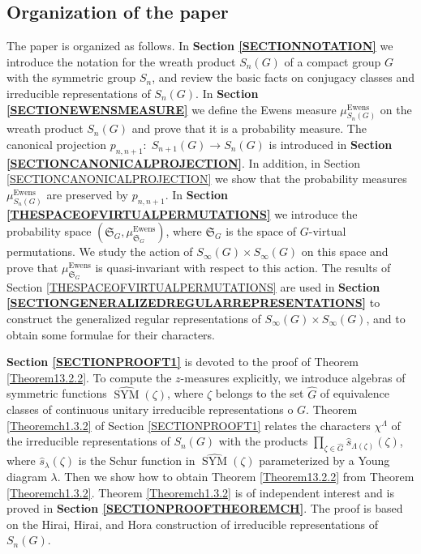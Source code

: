 \documentclass[12pt]{amsart}
\theoremstyle{definition}
\numberwithin{equation}{section}
\DeclareMathOperator{\SYM}{SYM}
\DeclareMathOperator{\Ewens}{Ewens}
\begin{document}
\subsection{Organization of the paper}
The paper is organized as follows. In \textbf{Section \ref{SECTIONNOTATION}} we introduce the notation for
the wreath product $S_n(G)$ of a compact group $G$ with the symmetric group $S_n$, and review the basic facts on conjugacy classes and irreducible representations of $S_n(G)$.
In \textbf{Section \ref{SECTIONEWENSMEASURE}} we define the Ewens measure $\mu_{S_n(G)}^{\Ewens}$ on the wreath product $S_n(G)$ and prove that it is a probability measure. The canonical projection
$p_{n,n+1}:\; S_{n+1}(G)\longrightarrow S_n(G)$ is introduced in \textbf{Section \ref{SECTIONCANONICALPROJECTION}}.
In addition, in Section \ref{SECTIONCANONICALPROJECTION} we show that the probability measures
$\mu_{S_n(G)}^{\Ewens}$ are preserved by $p_{n,n+1}$. In \textbf{Section \ref{THESPACEOFVIRTUALPERMUTATIONS}}
we introduce the probability space $\left(\mathfrak{S}_G,\mu^{\Ewens}_{\mathfrak{S}_G}\right)$,
where $\mathfrak{S}_{G}$ is the space of $G$-virtual permutations. We study the action of $S_{\infty}(G)\times S_{\infty}(G)$ on this space and prove that $\mu^{\Ewens}_{\mathfrak{S}_G}$ is quasi-invariant
with respect to this action. The results of Section \ref{THESPACEOFVIRTUALPERMUTATIONS} are used in
\textbf{Section \ref{SECTIONGENERALIZEDREGULARREPRESENTATIONS}} to construct the generalized
regular representations of $S_{\infty}(G)\times S_{\infty}(G)$, and to obtain
some formulae for their characters.

\textbf{Section \ref{SECTIONPROOFT1}} is devoted to
the proof of Theorem \ref{Theorem13.2.2}. To compute the $z$-measures explicitly, we introduce
algebras of symmetric functions $\widehat{\SYM}(\zeta)$, where $\zeta$ belongs to the set $\widehat{G}$
of equivalence classes of continuous unitary irreducible representations o $G$. Theorem \ref{Theoremch1.3.2}
of Section \ref{SECTIONPROOFT1} relates the characters $\chi^{\Lambda}$ of the irreducible
representations of $S_n(G)$ with the products $\prod_{\zeta\in\widehat{G}}\widehat{s}_{\Lambda(\zeta)}(\zeta)$,
where $\widehat{s}_{\lambda}(\zeta)$ is the Schur function in $\widehat{\SYM}(\zeta)$ parameterized by a Young diagram $\lambda$. Then we show how to obtain Theorem \ref{Theorem13.2.2} from Theorem \ref{Theoremch1.3.2}.
Theorem \ref{Theoremch1.3.2} is of independent interest and is proved in \textbf{Section \ref{SECTIONPROOFTHEOREMCH}}.
The proof is based on the Hirai, Hirai, and Hora construction of irreducible
representations of $S_n(G)$.
\end{document}
